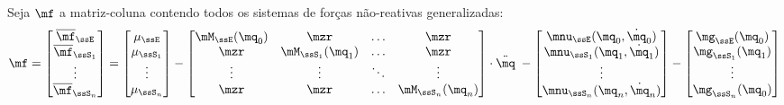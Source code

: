 \documentclass[]{politex}
\begin{document}
Seja $\mf$ a matriz-coluna contendo todos os sistemas de forças não-reativas generalizadas:
\begin{equation} \label{eq:fParalelos}
\mf = 
\begin{bmatrix}
\overline{\mf}_{\ssE} \\
\overline{\mf}_{\ssS_1} \\
\vdots \\
\overline{\mf}_{\ssS_n}  
\end{bmatrix}
=
\begin{bmatrix}
\mu_{\ssE} \\
\mu_{\ssS_1} \\
\vdots \\
\mu_{\ssS_n} 
\end{bmatrix}
-
\begin{bmatrix}
\mM_{\ssE}(\mq_0) & \mzr & \ldots & \mzr \\
\mzr & \mM_{\ssS_1}(\mq_1) & \ldots & \mzr\\
\vdots & \vdots & \ddots & \vdots\\
\mzr & \mzr &\ldots  & \mM_{\ssS_n}(\mq_n)
\end{bmatrix}
\cdot
\ddot{\mq} \;
-
\begin{bmatrix}
\mnu_{\ssE}(\mq_0,\dot{\mq}_0) \\
\mnu_{\ssS_1}(\mq_1,\dot{\mq}_1) \\
\vdots \\
\mnu_{\ssS_n}(\mq_n,\dot{\mq}_n)  
\end{bmatrix}
-
\begin{bmatrix}
\mg_{\ssE}(\mq_0) \\
\mg_{\ssS_1}(\mq_1) \\
\vdots \\
\mg_{\ssS_n}(\mq_0)  
\end{bmatrix}
\end{equation}
\end{document}
